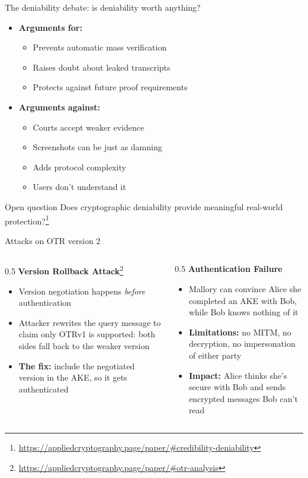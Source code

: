\ifdefined\PRESENTATION\else\PassOptionsToClass{handout}{beamer}\fi\documentclass[aspectratio=169, lualatex]{beamer}
\begin{document}
\begin{frame}{The deniability debate: is deniability worth anything?}
	\begin{itemize}
		\item \textbf{Arguments for:}
		      \begin{itemize}
			      \item Prevents automatic mass verification
			      \item Raises doubt about leaked transcripts
			      \item Protects against future proof requirements
		      \end{itemize}
		\item \textbf{Arguments against:}
		      \begin{itemize}
			      \item Courts accept weaker evidence
			      \item Screenshots can be just as damning
			      \item Adds protocol complexity
			      \item Users don't understand it
		      \end{itemize}
	\end{itemize}
	\begin{alertblock}{Open question}
		Does cryptographic deniability provide meaningful real-world protection?\footnote{\url{https://appliedcryptography.page/paper/\#credibility-deniability}}
	\end{alertblock}
\end{frame}

\begin{frame}{Attacks on OTR version 2}
	\begin{columns}
		\begin{column}{0.5\textwidth}
			\textbf{Version Rollback Attack}\footnote{\url{https://appliedcryptography.page/paper/\#otr-analysis}}
			\begin{itemize}
				\item Version negotiation happens \textit{before} authentication
				\item Attacker rewrites the query message to claim only OTRv1 is supported: both sides fall back to the weaker version
				\item \textbf{The fix:} include the negotiated version in the AKE, so it gets authenticated
			\end{itemize}
		\end{column}
		\begin{column}{0.5\textwidth}
			\textbf{Authentication Failure}
			\begin{itemize}
				\item Mallory can convince Alice she completed an AKE with Bob, while Bob knows nothing of it
				\item \textbf{Limitations:} no MITM, no decryption, no impersonation of either party
				\item \textbf{Impact:} Alice thinks she's secure with Bob and sends encrypted messages Bob can't read
			\end{itemize}
		\end{column}
	\end{columns}
\end{frame}
\end{document}
